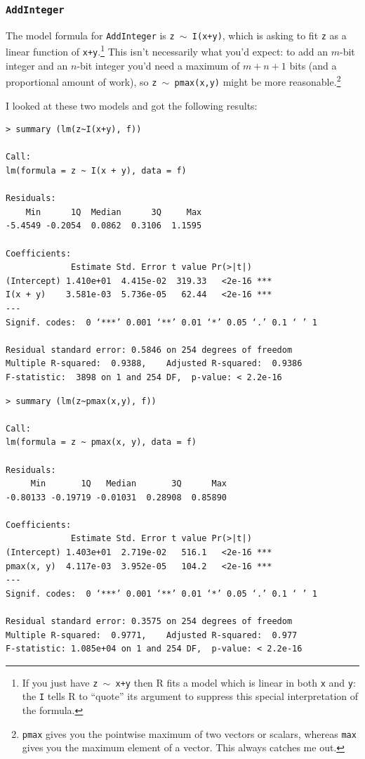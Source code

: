 \documentclass[a4paper]{article}
\begin{document}
\subsubsection*{\texttt{AddInteger}}
The model formula for \verb|AddInteger| is \texttt{z $\sim$ I(x+y)},
which is asking to fit \verb|z| as a linear function of
\verb|x+y|.\footnote{If you just have \texttt{z $\sim$ x+y} then R
  fits a model which is linear in both \texttt{x} and \texttt{y}: the
  \texttt{I} tells R to ``quote'' its argument to suppress this
  special interpretation of the formula.}  This isn't necessarily
what you'd expect: to add an $m$-bit integer and an $n$-bit integer
you'd need a maximum of $m+n+1$ bits (and a proportional amount of
work), so \texttt{z $\sim$ pmax(x,y)} might be more
reasonable.\footnote{ \texttt{pmax} gives you the pointwise maximum of
  two vectors or scalars, whereas \texttt{max} gives you the maximum
  element of a vector.  This always catches me out.}

I looked at these two models and got the following results:
\newpage
{\footnotesize
\begin{verbatim}
> summary (lm(z~I(x+y), f))

Call:
lm(formula = z ~ I(x + y), data = f)

Residuals:
    Min      1Q  Median      3Q     Max 
-5.4549 -0.2054  0.0862  0.3106  1.1595 

Coefficients:
             Estimate Std. Error t value Pr(>|t|)    
(Intercept) 1.410e+01  4.415e-02  319.33   <2e-16 ***
I(x + y)    3.581e-03  5.736e-05   62.44   <2e-16 ***
---
Signif. codes:  0 ‘***’ 0.001 ‘**’ 0.01 ‘*’ 0.05 ‘.’ 0.1 ‘ ’ 1

Residual standard error: 0.5846 on 254 degrees of freedom
Multiple R-squared:  0.9388,	Adjusted R-squared:  0.9386 
F-statistic:  3898 on 1 and 254 DF,  p-value: < 2.2e-16
\end{verbatim}
}

{\footnotesize
\begin{verbatim}
> summary (lm(z~pmax(x,y), f))

Call:
lm(formula = z ~ pmax(x, y), data = f)

Residuals:
     Min       1Q   Median       3Q      Max 
-0.80133 -0.19719 -0.01031  0.28908  0.85890 

Coefficients:
             Estimate Std. Error t value Pr(>|t|)    
(Intercept) 1.403e+01  2.719e-02   516.1   <2e-16 ***
pmax(x, y)  4.117e-03  3.952e-05   104.2   <2e-16 ***
---
Signif. codes:  0 ‘***’ 0.001 ‘**’ 0.01 ‘*’ 0.05 ‘.’ 0.1 ‘ ’ 1

Residual standard error: 0.3575 on 254 degrees of freedom
Multiple R-squared:  0.9771,	Adjusted R-squared:  0.977 
F-statistic: 1.085e+04 on 1 and 254 DF,  p-value: < 2.2e-16
\end{verbatim}
}  
\end{document}
